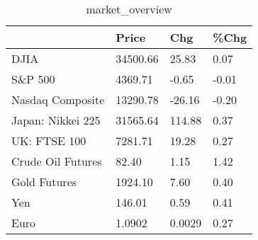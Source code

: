 \documentclass{article}%
\begin{document}
%


\begin{table}[htbp]%
\caption{market\_overview}%
\centering%
\begin{adjustbox}{width=1\textwidth}%
\begin{tabular}{llll}
\toprule
                  &    Price &    Chg &  \%Chg \\
\midrule
             DJIA & 34500.66 &  25.83 &  0.07 \\
          S\&P 500 &  4369.71 &  -0.65 & -0.01 \\
 Nasdaq Composite & 13290.78 & -26.16 & -0.20 \\
Japan: Nikkei 225 & 31565.64 & 114.88 &  0.37 \\
     UK: FTSE 100 &  7281.71 &  19.28 &  0.27 \\
Crude Oil Futures &    82.40 &   1.15 &  1.42 \\
     Gold Futures &  1924.10 &   7.60 &  0.40 \\
              Yen &   146.01 &   0.59 &  0.41 \\
             Euro &   1.0902 & 0.0029 &  0.27 \\
\bottomrule
\end{tabular}
%
\end{adjustbox}%
\end{table}

%
\end{document}
